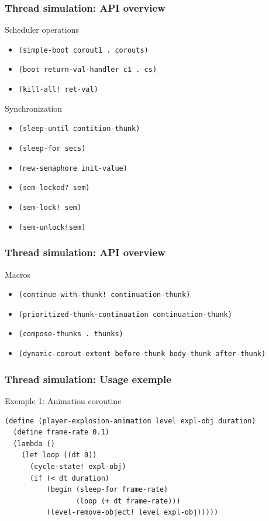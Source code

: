 \documentclass{beamer}
\newcommand{\<}[1]{\`#1}
\begin{document}
\begin{frame}
  \frametitle{Thread simulation: API overview}
  \begin{block}{Scheduler operations}
    \begin{itemize}
    \item \texttt{(simple-boot corout1 . corouts)}
    \item \texttt{(boot return-val-handler c1 . cs)}
    \item \texttt{(kill-all! ret-val)}
    \end{itemize}
  \end{block}

  \begin{block}{Synchronization}
    \begin{itemize}
    \item \texttt{(sleep-until contition-thunk)}
    \item \texttt{(sleep-for secs)}
    \item \texttt{(new-semaphore init-value)}
    \item \texttt{(sem-locked? sem)}
    \item \texttt{(sem-lock! sem)}
    \item \texttt{(sem-unlock!sem)}
    \end{itemize}
  \end{block}

\end{frame}

\begin{frame}
  \frametitle{Thread simulation: API overview}

  \begin{block}{Macros}
    \begin{itemize}
    \item \texttt{(continue-with-thunk! continuation-thunk)}
    \item \texttt{(prioritized-thunk-continuation continuation-thunk)}
    \item \texttt{(compose-thunks . thunks)}
    \item \texttt{(dynamic-corout-extent before-thunk body-thunk after-thunk)}
    \end{itemize}
  \end{block}

\end{frame}


\begin{frame}[fragile]
  \frametitle{Thread simulation: Usage exemple}
  \begin{block}{Exemple 1: Animation coroutine}
    \begin{lstlisting}[basicstyle=\footnotesize]
(define (player-explosion-animation level expl-obj duration)
  (define frame-rate 0.1)
  (lambda ()
    (let loop ((dt 0))
      (cycle-state! expl-obj)
      (if (< dt duration)
          (begin (sleep-for frame-rate)
                 (loop (+ dt frame-rate)))
          (level-remove-object! level expl-obj)))))
    \end{lstlisting}
    \end{block}
\end{frame}
\end{document}

